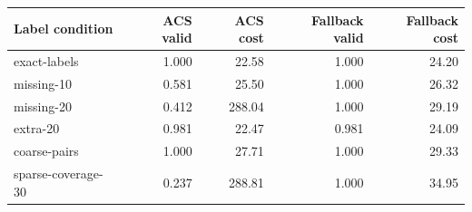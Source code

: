 \begin{tabular}{lrrrr}
\toprule
Label condition & ACS valid & ACS cost & Fallback valid & Fallback cost \\
\midrule
exact-labels & 1.000 & 22.58 & 1.000 & 24.20 \\
missing-10 & 0.581 & 25.50 & 1.000 & 26.32 \\
missing-20 & 0.412 & 288.04 & 1.000 & 29.19 \\
extra-20 & 0.981 & 22.47 & 0.981 & 24.09 \\
coarse-pairs & 1.000 & 27.71 & 1.000 & 29.33 \\
sparse-coverage-30 & 0.237 & 288.81 & 1.000 & 34.95 \\
\bottomrule
\end{tabular}
